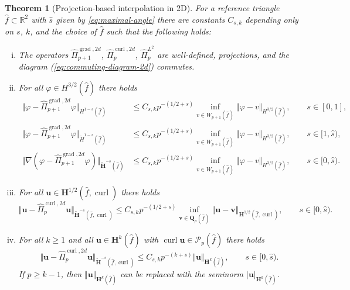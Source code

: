 \documentclass{article}
\newtheorem{theorem}{Theorem}[section]
\newcommand{\hatPicurlcomtwod}{\widehat \Pi^{\operatorname*{curl},2d}_p}
\newcommand{\hatPigradcomtwod}{\widehat\Pi^{\operatorname*{grad},2d}_{p+1}}
\begin{document}
\begin{theorem}[Projection-based interpolation in 2D]
\label{thm:projection-based-interpolation-2d} 
For a reference triangle $\widehat{f} \subset {\mathbb R}^2$ 
with $\widehat s$ given by \eqref{eq:maximal-angle}
there are constants $C_{s,k}$ depending only on 
$s$, $k$, and the  choice of $\widehat f$ such that the following holds: 

\begin{enumerate}
[(i)]

\item 
\label{item:thm:projection-based-interpolation-i-2d} 
The operators $\hatPigradcomtwod$, $\hatPicurlcomtwod$, $\widehat{\Pi}^{L^2}_p$ are well-defined, projections, 
and the diagram (\ref{eq:commuting-diagram-2d}) commutes.

\item 
\label{item:thm:projection-based-interpolation-ii-2d} 
For all $\varphi\in
H^{3/2}(\widehat{f})$ there holds
\begin{align*}
\Vert\varphi-\hatPigradcomtwod\varphi\Vert
_{H^{1-s}(\widehat{f})}& \leq 
C_{s,k}p^{-(1/2+s)}\inf_{v\in W_{p+1}(\widehat{f})}\Vert\varphi-v\Vert_{H^{3/2}(\widehat{f})},\qquad
s\in [0,1], \\
\Vert\varphi-\hatPigradcomtwod\varphi\Vert
_{\widetilde H^{1-s}(\widehat{f})}& \leq 
C_{s,k}p^{-(1/2+s)}\inf_{v\in W_{p+1}(\widehat{f})}\Vert\varphi-v\Vert_{H^{3/2}(\widehat{f})},\qquad
s\in [1,\widehat{s}), \\
\Vert \nabla(\varphi-\hatPigradcomtwod \varphi)\Vert_{\widetilde{\mathbf{H}}^{-s}(\widehat{f})}& \leq
C_{s,k}p^{-(1/2+s)}\inf_{v \in W_{p+1}(\widehat f)} \Vert \varphi -v \Vert_{H^{3/2}(\widehat{f})} ,
\qquad s \in [0,\widehat{s}).
\end{align*}

\item 
\label{item:thm:projection-based-interpolation-iii-2d} 
For all ${\mathbf{u}}\in{\mathbf{H}}^{1/2}(\widehat{f},\operatorname{curl})$ there holds
\[
\Vert{\mathbf{u}}-\hatPicurlcomtwod{\mathbf{u}}%
\Vert_{\widetilde{\mathbf{H}}^{-s}(\widehat{f},\operatorname{curl})}\leq C_{s,k} p^{-(1/2+s)}%
\inf_{\mathbf{v}\in\mathbf{Q}_p(\widehat{f})}\Vert{\mathbf{u}}-{\mathbf{v}}\Vert_{\mathbf{H}^{1/2}(\widehat{f},\operatorname{curl})}, \qquad s\in [0,\widehat{s}).
\]


\item 
\label{item:thm:projection-based-interpolation-iv-2d} 
For all $k\geq1$ and all ${\mathbf{u}}\in{\mathbf{H}}^{k}(\widehat{f})$ with $\operatorname*{curl}{\mathbf{u}}\in{\mathcal{P}}_{p}(\widehat{f})$ there holds
\begin{equation}
\Vert{\mathbf{u}}-\hatPicurlcomtwod{\mathbf{u}}%
\Vert_{\widetilde{\mathbf{H}}^{-s}(\widehat{f},\operatorname{curl})}\leq C_{s,k}p^{-(k+s)}\Vert{\mathbf{u}}\Vert
_{\mathbf{H}^{k}(\widehat{f})}, \qquad s\in [0,\widehat{s}).
\label{eq:lemma:projection-based-interpolation-approximation-2d-10}%
\end{equation}
If $p\geq k-1$, then $\Vert{\mathbf{u}}\Vert_{{\mathbf{H}}%
^{k}(\widehat{f})}$ can be replaced with the seminorm $|{\mathbf{u}%
}|_{{\mathbf{H}}^{k}(\widehat{f})}$.
\end{enumerate}
\end{theorem}
\end{document}
